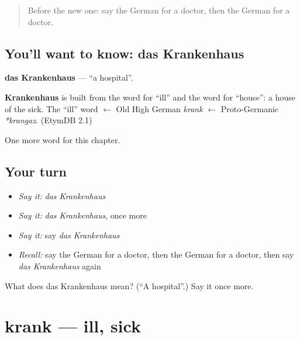 \label{lesson:GE-C59-krankenhaus}



\begin{quote}
Before the new one: say the German for a doctor, then the German for a doctor.
\end{quote}

\subsection*{You'll want to know: das Krankenhaus}
\textbf{das Krankenhaus} — \textquotedblleft{}a hospital\textquotedblright{}.

\begin{cousinweb}
\textbf{Krankenhaus} is built from the word for \textquotedblleft{}ill\textquotedblright{} and the word for \textquotedblleft{}house\textquotedblright{}: a house of the sick. The \textquotedblleft{}ill\textquotedblright{} word $\leftarrow$ Old High German \emph{krank} $\leftarrow$ Proto-Germanic \emph{*krangaz}. (EtymDB 2.1)
\end{cousinweb}

\begin{grammarlens}[title={What you've built}]
One more word for this chapter.
\end{grammarlens}

\subsection*{Your turn}
\begin{itemize}
\raggedright
  \item \emph{Say it:} \emph{das Krankenhaus}
  \item \emph{Say it:} \emph{das Krankenhaus}, once more
  \item \emph{Say it:} say \emph{das Krankenhaus}
  \item \emph{Recall:} say the German for a doctor, then the German for a doctor, then say \emph{das Krankenhaus} again
\end{itemize}

\begin{tcolorbox}[breakable,colback=teal!4,colframe=teal!35!black,title={Before you move on}]
What does das Krankenhaus mean? (\textquotedblleft{}A hospital\textquotedblright{}.) Say it once more.
\end{tcolorbox}
\section[krank]{krank — ill, sick}

